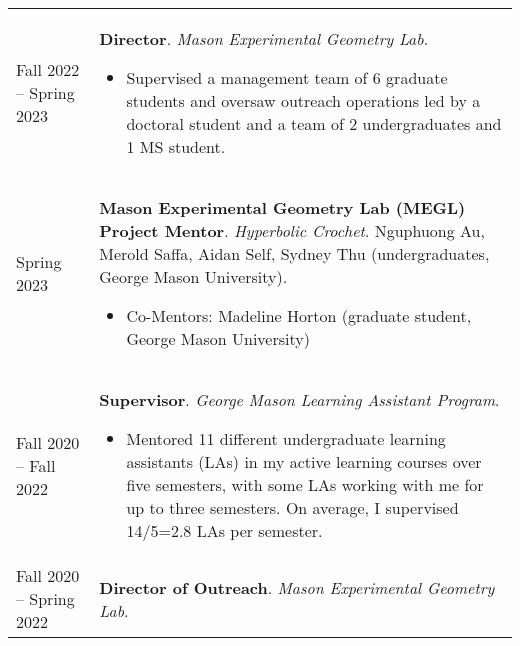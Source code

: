 
    \medskip


    \medskip
    
    \begin{center}
    {
    \renewcommand{\arraystretch}{1.5}
    \begin{longtable}{p{}  p{}}
      Fall 2022 --   Spring 2023 & \textbf{Director}. \textit{Mason Experimental Geometry Lab}. 
        \hspace{-1em}

        {\small
        \begin{itemize}
        \setlength{\parindent}{0em}
        \item[] Supervised a management team of 6 graduate students and oversaw outreach operations led by a doctoral student and a team of 2 undergraduates and 1 MS student.
        \end{itemize}
        }
        \vspace{-1em}
         \\ 
  Spring 2023 & \textbf{Mason Experimental Geometry Lab (MEGL) Project Mentor}. \textit{Hyperbolic Crochet}.  Nguphuong Au, Merold Saffa, Aidan Self, Sydney Thu (undergraduates, George Mason University). 
        \hspace{-1em}

        {\small
        \begin{itemize}
        \setlength{\parindent}{0em}
        \item[] 
            Co-Mentors: Madeline Horton (graduate student, George Mason University) 
        \end{itemize}
        }
        \vspace{-1em}
         \\ 
  Fall 2020 --   Fall 2022 & \textbf{Supervisor}. \textit{George Mason Learning Assistant Program}. 
        \hspace{-1em}

        {\small
        \begin{itemize}
        \setlength{\parindent}{0em}
        \item[] Mentored 11 different undergraduate learning assistants (LAs) in my active learning courses over five semesters, with some LAs working with me for up to three semesters. On average, I supervised 14/5=2.8 LAs per semester.
        \end{itemize}
        }
        \vspace{-1em}
         \\ 
  Fall 2020 --   Spring 2022 & \textbf{Director of Outreach}. \textit{Mason Experimental Geometry Lab}. 
        \hspace{-1em}


\end{longtable}}
\end{center}
